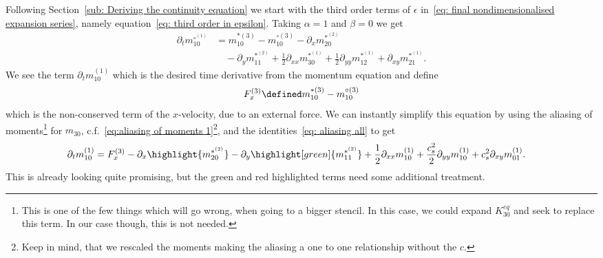 Following Section~\ref{sub: Deriving the continuity equation} we start with the third order terms of
$\epsilon$ in~\eqref{eq: final nondimensionalised expansion series}, namely equation~\eqref{eq: third order in epsilon}.
Taking $\alpha=1$ and $\beta=0$ we get
\begin{equation}
  \begin{aligned}
     \partial_t m_{10}^{\circ^{(1)}} & =
    m_{10}^{*(3)} - m_{10}^{\circ{(3)}} - \partial_x m_{20}^{*^{(2)}} \\
    &\quad - \partial_y m_{11}^{*^{(2)}} + \frac{1}{2}\partial_{xx} m_{30}^{*^{(1)}} + \frac{1}{2} \partial_{yy} m_{12}^{*^{(1)}} + \partial_{xy} m_{21}^{*^{(1)}}.
  \end{aligned}
\end{equation}
We see the term $\partial_t m_{10}^{(1)} $ which is the desired time derivative from the momentum equation and define
\begin{equation}
   F_x^{(3)}\defined m_{10}^{*(3)} - m_{10}^{\circ{(3)}}
\end{equation}
which is the non-conserved term of the $x$-velocity, due to an external force.
We can instantly simplify this equation by using the aliasing of moments\footnote{This is one of the few things which will go wrong, when going to a bigger stencil.
In this case, we could expand $K_{30}^{eq}$ and seek to replace this term.
In our case though, this is not needed.} for $m_{30}$, c.f.~\eqref{eq:aliasing of moments 1}\footnote{Keep in mind, that we rescaled the moments making the aliasing a one to one relationship without the $c$.}, and the identities~\eqref{eq: aliasing all} to get
\begin{equation}
  \label{eq: start of momentum equation derivation}
  \begin{aligned}
    \partial_t m_{10}^{(1)} & =
    F_x^{(3)} - \partial_x \highlight{m_{20}^{*^{(2)}}} - \partial_y \highlight[green]{m_{11}^{*^{(2)}}} + \frac{1}{2}\partial_{xx} m_{10}^{(1)} + \frac{c_s^2}{2} \partial_{yy} m_{10}^{(1)} + c_s^2\partial_{xy} m_{01}^{(1)}.
  \end{aligned}
\end{equation}
This is already looking quite promising, but the green and red highlighted terms need some additional treatment.

